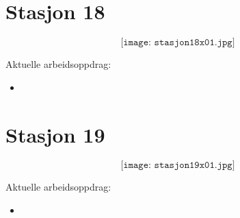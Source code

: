 \section{Stasjon 18}

$$\texttt{[image: stasjon18x01.jpg]}$$

Aktuelle arbeidsoppdrag:\\
\begin{itemize}[noitemsep]
	\item 
\end{itemize}

\section{Stasjon 19}

$$\texttt{[image: stasjon19x01.jpg]}$$

Aktuelle arbeidsoppdrag:\\
\begin{itemize}[noitemsep]
	\item 
\end{itemize}













































